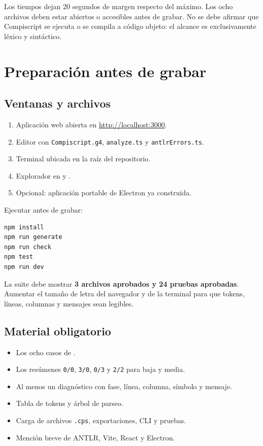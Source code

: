 \documentclass[11pt,letterpaper,oneside]{article}
\newcommand{\codigo}[1]{\texttt{#1}}
\begin{document}
Los tiempos dejan 20 segundos de margen respecto del máximo. Los ocho archivos deben
estar abiertos o accesibles antes de grabar. No se debe afirmar que Compiscript se
ejecuta o se compila a código objeto: el alcance es exclusivamente léxico y
sintáctico.

\tableofcontents
\clearpage
{}

\section{Preparación antes de grabar}

\subsection{Ventanas y archivos}

\begin{enumerate}
  \item Aplicación web abierta en \url{http://localhost:3000}.
  \item Editor con \codigo{Compiscript.g4}, \codigo{analyze.ts} y
        \codigo{antlrErrors.ts}.
  \item Terminal ubicada en la raíz del repositorio.
  \item Explorador en  y
        .
  \item Opcional: aplicación portable de Electron ya construida.
\end{enumerate}

Ejecutar antes de grabar:

\begin{verbatim}
npm install
npm run generate
npm run check
npm test
npm run dev
\end{verbatim}

La suite debe mostrar \textbf{3 archivos aprobados y 24 pruebas aprobadas}. Aumentar
el tamaño de letra del navegador y de la terminal para que tokens, líneas, columnas y
mensajes sean legibles.

\subsection{Material obligatorio}

\begin{itemize}
  \item Los ocho casos de .
  \item Los resúmenes \codigo{0/0}, \codigo{3/0}, \codigo{0/3} y
        \codigo{2/2} para baja y media.
  \item Al menos un diagnóstico con fase, línea, columna, símbolo y mensaje.
  \item Tabla de tokens y árbol de parseo.
  \item Carga de archivos \codigo{.cps}, exportaciones, CLI y pruebas.
  \item Mención breve de ANTLR, Vite, React y Electron.
\end{itemize}
\end{document}
